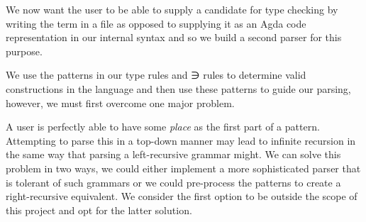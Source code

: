 {\begin{code}
\AgdaSymbol{)}\<%
\\
\>[0]\AgdaSpace{}%
\AgdaSpace{}%
\AgdaSpace{}%
\AgdaSpace{}%
\AgdaSymbol{(}\AgdaSymbol{;}\AgdaSpace{}%
\AgdaSymbol{;}\AgdaSpace{}%
\AgdaSymbol{)}\<%
\\
\>[0]\AgdaSpace{}%
\AgdaSpace{}%
\AgdaSpace{}%
\AgdaSymbol{(}\AgdaSpace{}%
\AgdaSpace{}%
\AgdaSymbol{)}\<%
\\
\>[0]\AgdaSpace{}%
\AgdaSpace{}%
\AgdaSpace{}%
\AgdaSymbol{(}\AgdaSpace{}%
\AgdaSpace{}%
\AgdaSymbol{)}\<%
\\
\>[0]\AgdaSpace{}%
\AgdaSpace{}%
\AgdaSpace{}%
\AgdaSymbol{(}\AgdaSymbol{)}\<%
\\
\>[0]\AgdaSpace{}%
\AgdaSpace{}%
\AgdaSpace{}%
\AgdaSpace{}%
\AgdaSymbol{(}\AgdaSymbol{;}\AgdaSpace{}%
\AgdaSymbol{)}\<%
\end{code}
}
We now want the user to be able to supply a candidate for type checking by
writing the term in a file as opposed to supplying it as an Agda code
representation in our internal syntax and so we build a second parser for this
purpose.

We use the patterns in our type rules and ∋ rules to determine valid
constructions in the language and then use these patterns to guide our parsing,
however, we must first overcome one major problem.

A user is perfectly able to have some \emph{place} as the first part of a pattern.
Attempting to parse this in a top-down manner may lead to infinite recursion in
the same way that parsing a left-recursive grammar might. We can solve this problem
in two ways, we could either implement a more sophisticated parser that is tolerant
of such grammars or we could pre-process the patterns to create a right-recursive
equivalent. We consider the first option to be outside the scope of this project and
opt for the latter solution.

